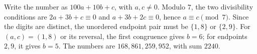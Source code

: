 Write the number as $100a+10b+c$, with $a,c\ne0$. Modulo $7$, the two divisibility conditions are $2a+3b+c\equiv0$ and $a+3b+2c\equiv0$, hence $a\equiv c\pmod7$. Since the digits are distinct, the unordered endpoint pair must be $\{1,8\}$ or $\{2,9\}$. For $(a,c)=(1,8)$ or its reversal, the first congruence gives $b=6$; for endpoints $2,9$, it gives $b=5$. The numbers are $168,861,259,952$, with sum $\boxed{2240}$.
